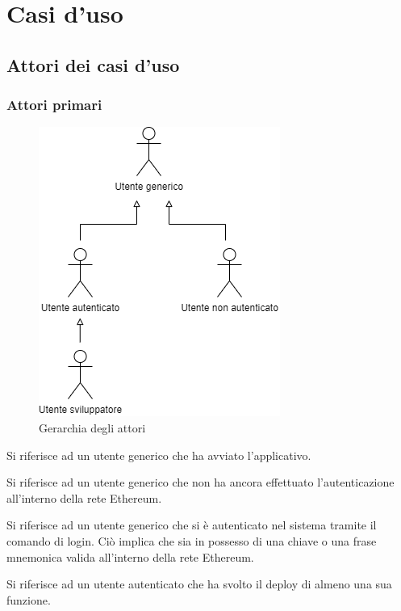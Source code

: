 \section{Casi d'uso}
\subsection{Attori dei casi d'uso}

	\subsubsection{Attori primari}
		\begin{figure}[h]
			\centering
			\includegraphics[scale=0.5]{./res/img/gerarchia.png}
			\caption {Gerarchia degli attori}
		\end{figure}
		\begin{description}[style=nextline]
			\item[\textbf{Utente generico}]
				Si riferisce ad un utente generico che ha avviato l'applicativo. 
			\item[\textbf{Utente non autenticato}]
				Si riferisce ad un utente generico che non ha ancora effettuato l'autenticazione all'interno della rete Ethereum. 
			\item[\textbf{Utente autenticato}]
				Si riferisce ad un utente generico che si è autenticato nel sistema tramite il comando di login. Ciò implica che sia in possesso di una chiave o una frase mnemonica valida all'interno della rete Ethereum. 
			\item[\textbf{Utente sviuppatore}] 
				Si riferisce ad un utente autenticato che ha svolto il deploy di almeno una sua funzione. 
		\end{description}
	

